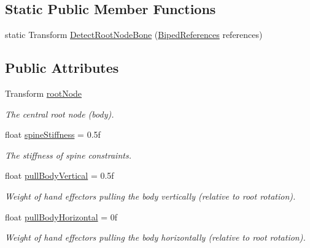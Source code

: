 \subsection*{Static Public Member Functions}
\begin{DoxyCompactItemize}
\item 
static Transform \mbox{\hyperlink{class_root_motion_1_1_final_i_k_1_1_i_k_solver_full_body_biped_acee1adb26e3fbc41c6aa3df2c321beb7}{Detect\+Root\+Node\+Bone}} (\mbox{\hyperlink{class_root_motion_1_1_biped_references}{Biped\+References}} references)
\end{DoxyCompactItemize}
\subsection*{Public Attributes}
\begin{DoxyCompactItemize}
\item 
Transform \mbox{\hyperlink{class_root_motion_1_1_final_i_k_1_1_i_k_solver_full_body_biped_a9a18dc6b6c5d26df3e1ec2ab33b07239}{root\+Node}}
\begin{DoxyCompactList}\small\item\em The central root node (body). \end{DoxyCompactList}\item 
float \mbox{\hyperlink{class_root_motion_1_1_final_i_k_1_1_i_k_solver_full_body_biped_a0bb52386758a3e1f814379ffb816993f}{spine\+Stiffness}} = 0.\+5f
\begin{DoxyCompactList}\small\item\em The stiffness of spine constraints. \end{DoxyCompactList}\item 
float \mbox{\hyperlink{class_root_motion_1_1_final_i_k_1_1_i_k_solver_full_body_biped_a241d1c7f67c5d4d3c3eef2792a9462c1}{pull\+Body\+Vertical}} = 0.\+5f
\begin{DoxyCompactList}\small\item\em Weight of hand effectors pulling the body vertically (relative to root rotation). \end{DoxyCompactList}\item 
float \mbox{\hyperlink{class_root_motion_1_1_final_i_k_1_1_i_k_solver_full_body_biped_ac7ecc58a1fdf03a6e0d564698905622e}{pull\+Body\+Horizontal}} = 0f
\begin{DoxyCompactList}\small\item\em Weight of hand effectors pulling the body horizontally (relative to root rotation). \end{DoxyCompactList}\end{DoxyCompactItemize}
